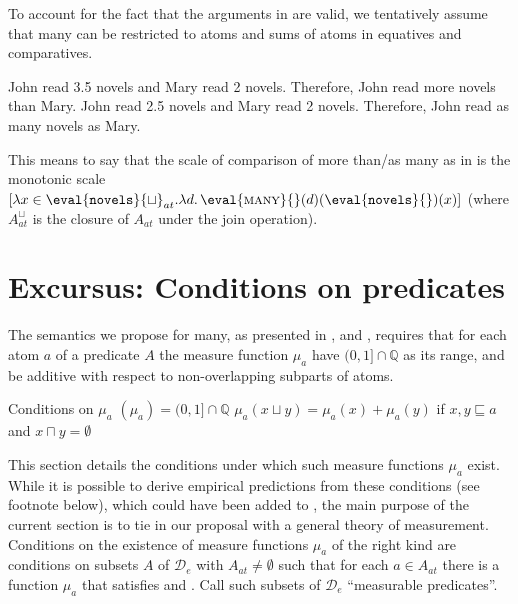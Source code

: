 \documentclass[output=paper]{langscibook}
\begin{document}
\noindent To account for the fact that the arguments in  are valid, we tentatively assume that {\sc many} can be restricted to atoms and sums of atoms in equatives and comparatives.

\ea\label{hai-tri:ValidArgs}
\ea John read 3.5 novels and Mary read 2 novels. Therefore, John read more novels than Mary.
\ex John read 2.5 novels and Mary read 2 novels. Therefore, John read as many novels as Mary.
\z
\z

\noindent This means to say that the scale of comparison of {\ttfamily more than}/{\ttfamily as many as} in  is the monotonic scale $[\lambda x\in\eval{\mbox{\ttfamily novels}}{\sqcup}_{at}.\lambda d.\,\eval{\mbox{\sc many}}{}(d)(\eval{\mbox{\ttfamily novels}}{})(x)]$ (where $A_{at}^{\sqcup}$ is the closure of $A_{at}$ under the join operation).

\section{Excursus: Conditions on predicates}

The semantics we propose for {\sc many}, as presented in ,  and , requires that for each atom $a$ of a predicate $A$ the measure function $\mu_a$ have $(0,1]\cap\mathbb{Q}$ as its range, and be additive with respect to non-overlapping subparts of atoms.

\ea Conditions on $\mu_a$
\ea {}$(\mu_a) = (0,1]\cap\mathbb{Q}$ 
\label{hai-tri:range}
\ex $\mu_a(x \sqcup y) = \mu_a(x) + \mu_a(y)$ if $x, y \sqsubseteq a$ and $x \sqcap y = \emptyset$ 
\label{hai-tri:additivity}
\z
\z

\noindent This section details the conditions under which such measure functions $\mu_a$ exist. While it is possible to derive empirical predictions from these conditions (see footnote  below), which could have been added to , the main purpose of the current section is to tie in our proposal with a general theory of measurement. Conditions on the existence of measure functions $\mu_a$ of the right kind are conditions on subsets $A$ of $\mathcal{D}_e$ with $A_{at}\ne\emptyset$ such that for each $a\in A_{at}$ there is a function $\mu_a$ that satisfies  and . Call such subsets of $\mathcal{D}_e$ ``measurable predicates''.
\end{document}
